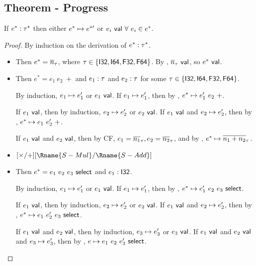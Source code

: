 \documentclass{article}
\begin{document}
\subsection{Theorem - Progress}
If $e^* : \tau^*$ then either $e^*\mapsto e^{*\prime}$ or $e_i ~\mathsf{val}~ \forall~ e_i \in e^*$.
\begin{proof}
    By induction on the derivation of $e^* : \tau^*$.
    \begin{itemize}
        \item {}
            Then $e^* = \overline{n}_\tau$, where $\tau \in \{\mathsf{I32}, \mathsf{I64}, \mathsf{F32}, \mathsf{F64}\}$.
            By , $\overline{n}_\tau ~\mathsf{val}$, so $e^* ~\mathsf{val}$.
        
        \item {}
            Then $e^* = e_1~ e_2~ +$ and $e_1 : \tau$ and $e_2 : \tau$ for some $\tau \in \{\mathsf{I32}, \mathsf{I64}, \mathsf{F32}, \mathsf{F64}\}$.
            
            By induction, $e_1 \mapsto e_1'$ or $e_1 ~\mathsf{val}$.
            If $e_1 \mapsto e_1'$, then by , $e^* \mapsto e_1'~ e_2~ +$.
            
            If $e_1 ~\mathsf{val}$, then by induction, $e_2 \mapsto e_2'$ or $e_2 ~\mathsf{val}$.
            If $e_1 ~\mathsf{val}$ and $e_2 \mapsto e_2'$, then by , $e^* \mapsto e_1~ e_2'~ +$.
            
            If $e_1 ~\mathsf{val}$ and $e_2 ~\mathsf{val}$, then by CF, $e_1 = \overline{n_1}_\tau, e_2 = \overline{n_2}_\tau$, and by , $e^* \mapsto \overline{n_1 + n_2}_\tau$.
        
        \item {}
            $[\times / +][\Rname{S-Mul} / \Rname{S-Add}]$ 
        
        \item {}
            Then $e^* = e_1 ~ e_2 ~ e_3 ~ \mathsf{select}$ and $e_1 : \mathsf{I32}$. %
            
            By induction, $e_1 \mapsto e_1'$ or $e_1 ~\mathsf{val}$.
            If $e_1 \mapsto e_1'$, then by , $e^* \mapsto e_1' ~ e_2 ~ e_3 ~ \mathsf{select}$.
            
            If $e_1 ~\mathsf{val}$, then by induction, $e_2 \mapsto e_2'$ or $e_2 ~\mathsf{val}$.
            If $e_1 ~\mathsf{val}$ and $e_2 \mapsto e_2'$, then by , $e^* \mapsto e_1 ~ e_2' ~ e_3 ~ \mathsf{select}$.
            
            If $e_1 ~\mathsf{val}$ and $e_2 ~\mathsf{val}$, then by induction, $e_3 \mapsto e_3'$ or $e_3 ~\mathsf{val}$.
            If $e_1 ~\mathsf{val}$ and $e_2 ~\mathsf{val}$ and $e_3 \mapsto e_3'$, then by , $e \mapsto e_1 ~ e_2 ~ e_3' ~ \mathsf{select}$.
            

\end{itemize}
\end{proof}
\end{document}
